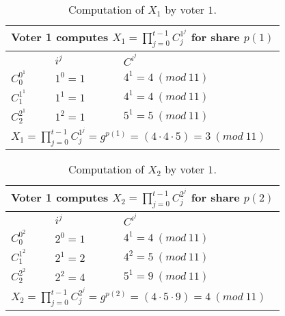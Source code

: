 \begin{table}[H]
\centering
\begin{tabular}{|l|l|l|}
\hline
\multicolumn{3}{|l|}{\textbf{Voter 1 computes $X_1 =\prod\limits_{j=0}^{t-1} C_j^{1^j}$  for share $p(1)$ }}          \\ \hline
                                                         & $i^j$              & $C^{i^{j}}$          \\ \hline
$C^{0^{1}}_0$           & $1^{0} = 1$          & $4^{1} = 4 \ (mod \ 11)$                   \\ \hline
$C^{1^{1}}_1$           & $1^{1} = 1$          & $4^{1} = 4 \ (mod \ 11)$                   \\ \hline
$C^{2^{1}}_2$           & $1^{2} = 1$          & $5^{1} = 5 \ (mod \ 11)$                   \\ \hline
\multicolumn{3}{|l|}{$X_1 =\prod\limits_{j=0}^{t-1} C_j^{1^j} = g^{p(1)} = (4 \cdot 4 \cdot 5) = 3 \ (mod \ 11)$} \\ \hline
\end{tabular}
\caption{Computation of $X_1$ by voter $1$. }
\label{my-label}
\end{table}


\begin{table}[H]
\centering
\begin{tabular}{|l|l|l|}
\hline
\multicolumn{3}{|l|}{\textbf{Voter 1 computes $X_2 =\prod\limits_{j=0}^{t-1} C_j^{2^j}$  for share $p(2)$ }}          \\ \hline
                                                         & $i^j$              & $C^{i^{j}}$          \\ \hline
$C^{0^{2}}_0$           & $2^{0} = 1$          & $4^{1} = 4 \ (mod \ 11)$                   \\ \hline
$C^{1^{2}}_1$           & $2^{1} = 2$          & $4^{2} = 5 \ (mod \ 11)$                   \\ \hline
$C^{2^{2}}_2$           & $2^{2} = 4$          & $5^{1} = 9 \ (mod \ 11)$                   \\ \hline
\multicolumn{3}{|l|}{$X_2 =\prod\limits_{j=0}^{t-1} C_j^{2^j} = g^{p(2)} = (4 \cdot 5 \cdot 9) = 4 \ (mod \ 11)$} \\ \hline
\end{tabular}
\caption{Computation of $X_2$ by voter $1$. }
\label{my-label}
\end{table}

